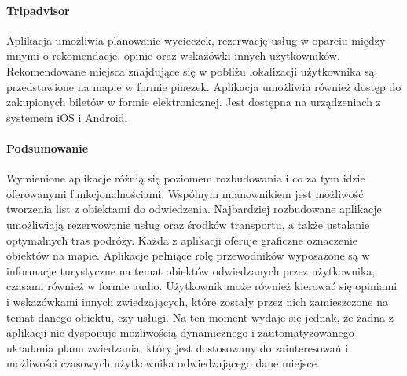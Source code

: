 \paragraph{Tripadvisor}

Aplikacja umożliwia planowanie wycieczek, rezerwację usług  w oparciu między innymi o rekomendacje, opinie oraz wskazówki innych użytkowników.
Rekomendowane miejsca znajdujące się w pobliżu lokalizacji użytkownika są przedstawione na mapie w formie pinezek. Aplikacja umożliwia również dostęp
do zakupionych biletów w formie elektronicznej. Jest dostępna na urządzeniach z systemem iOS i Android.

\paragraph{Podsumowanie}

Wymienione aplikacje różnią się poziomem rozbudowania i co za tym idzie oferowanymi funkcjonalnościami.
Wspólnym mianownikiem jest możliwość tworzenia list z obiektami do odwiedzenia. Najbardziej rozbudowane aplikacje umożliwiają rezerwowanie usług
oraz środków transportu, a także ustalanie optymalnych tras podróży. Każda z aplikacji oferuje graficzne oznaczenie obiektów na mapie. Aplikacje
pełniące rolę przewodników wyposażone są w informacje turystyczne na temat obiektów odwiedzanych przez użytkownika, czasami również w formie audio.
Użytkownik może również kierować się opiniami i wskazówkami innych zwiedzających, które zostały przez nich zamieszczone na temat danego obiektu,
czy usługi. Na ten moment wydaje się jednak, że żadna z aplikacji nie dysponuje możliwością dynamicznego i zautomatyzowanego układania planu zwiedzania,
który jest dostosowany do zainteresowań i możliwości czasowych użytkownika odwiedzającego dane miejsce.
